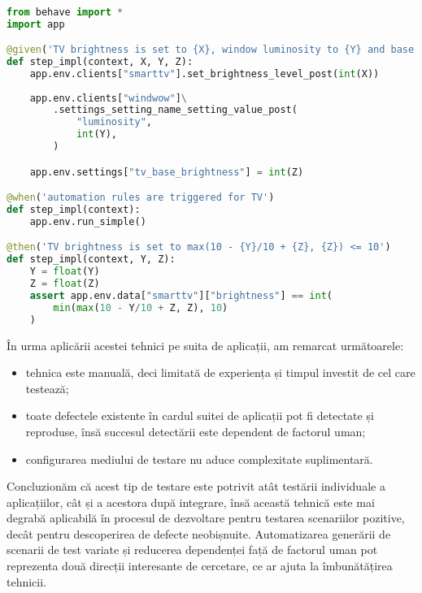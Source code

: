 \begin{lstlisting}[caption={Exemplu de test automat folosind biblioteca Behave}, label={exemplu_python_behave}, language={Python}]

from behave import *
import app

@given('TV brightness is set to {X}, window luminosity to {Y} and base luminosity to {Z}')
def step_impl(context, X, Y, Z):
    app.env.clients["smarttv"].set_brightness_level_post(int(X))
    
    app.env.clients["windwow"]\
        .settings_setting_name_setting_value_post(
            "luminosity", 
            int(Y),
        )

    app.env.settings["tv_base_brightness"] = int(Z)

@when('automation rules are triggered for TV')
def step_impl(context):
    app.env.run_simple()

@then('TV brightness is set to max(10 - {Y}/10 + {Z}, {Z}) <= 10')
def step_impl(context, Y, Z):
    Y = float(Y)
    Z = float(Z)
    assert app.env.data["smarttv"]["brightness"] == int(
        min(max(10 - Y/10 + Z, Z), 10)
    )
\end{lstlisting}

În urma aplicării acestei tehnici pe suita de aplicații, am remarcat următoarele:
\begin{itemize}
    \item tehnica este manuală, deci limitată de experiența și timpul investit de cel care testează;
    \item toate defectele existente în cardul suitei de aplicații pot fi detectate și reproduse, însă succesul detectării este dependent de factorul uman;
    \item configurarea mediului de testare nu aduce complexitate suplimentară.
\end{itemize}

Concluzionăm că acest tip de testare este potrivit atât testării individuale a aplicațiilor, cât și a acestora după integrare, însă această tehnică este mai degrabă aplicabilă în procesul de dezvoltare pentru testarea scenariilor pozitive, decât pentru descoperirea de defecte neobișnuite. Automatizarea generării de scenarii de test variate și reducerea dependenței față de factorul uman pot reprezenta două direcții interesante de cercetare, ce ar ajuta la îmbunătățirea tehnicii.


